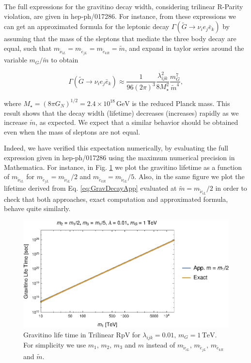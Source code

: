 \documentclass[a4paper,11pt]{article}
\begin{document}
The full expressions for the gravitino decay width, considering trilinear
R-Parity violation, are given in hep-ph/017286. For instance, from
these expressions we can get an approximated formula for the leptonic
decay $\Gamma(\tilde{G}\rightarrow\nu_{i}e_{j}\bar{e}_{k})$ by assuming
that the mass of the sleptons that mediate the three body decay are
equal, such that $m_{\tilde{\nu}_{iL}}=m_{\tilde{e}_{jL}}=m_{\tilde{e}_{kR}}=\tilde{m}$,
and expand in taylor series around the variable $m_{G}/\tilde{m}$
to obtain

\begin{equation}
\Gamma(\tilde{G}\rightarrow\nu_{i}e_{j}\bar{e}_{k})\approx\frac{1}{96(2\pi)^{3}}\frac{\lambda_{ijk}^{2}}{8M_{\star}^{2}}\frac{m_{G}^{7}}{\tilde{m}^{4}},\label{eq:GravDecayApp}
\end{equation}


\noindent where $M_{\star}=(8\pi G_{N})^{1/2}=2.4\times10^{18}\,\mbox{GeV}$
is the reduced Planck mass. This result shows that the decay width
(lifetime) decreases (increases) rapidly as we increase $\tilde{m}$,
as expected. We expect that a similar behavior should be obtained
even when the mass of sleptons are not equal.

Indeed, we have verified this expectation numerically, by evaluating
the full expression given in hep-ph/017286 using the maximum numerical
precision in Mathematica. For instance, in Fig. \ref{fig:Gravitino-life-time}
we plot the gravitino lifetime as a function of $m_{\tilde{\nu}_{iL}}$
for $m_{\tilde{e}_{jL}}=m_{\tilde{\nu}_{iL}}/2$ and $m_{\tilde{e}_{kR}}=m_{\tilde{\nu}_{iL}}/5$.
Also, in the same figure we plot the lifetime derived from Eq. \ref{eq:GravDecayApp}
evaluated at $\tilde{m}=m_{\tilde{\nu}_{iL}}/2$ in order to check
that both approaches, exact computation and approximated formula,
behave quite similarly.

\begin{figure}
\begin{centering}
\includegraphics[scale=0.8]{GravitinoDecaym1m2m3Final}
\par\end{centering}

\caption{\label{fig:Gravitino-life-time}Gravitino life time in Trilinear RpV
for $\lambda_{ijk}=0.01,\,m_{G}=1\,\mbox{TeV}$. For simplicity we
use $m_{1},\,m_{2},\,m_{3}$ and $m$ instead of $m_{\tilde{\nu}_{iL}},\,m_{\tilde{e}_{jL}},\,m_{\tilde{e}_{kR}}$
and $\tilde{m}$.}
\end{figure}
\end{document}

